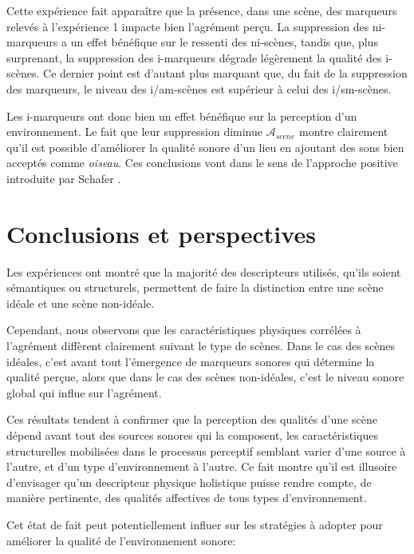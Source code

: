 \documentclass[twoside,twocolumn]{article}
\begin{document}
Cette expérience fait apparaître que la présence, dans une scène, des marqueurs relevés à l'expérience 1 impacte bien l'agrément perçu. La suppression des ni-marqueurs a un effet bénéfique sur le ressenti des ni-scènes, tandis que, plus surprenant, la suppression des i-marqueurs dégrade légèrement la qualité des i-scènes. Ce dernier point est d'autant plus marquant que, du fait de la suppression des marqueurs, le niveau des i/am-scènes est supérieur à celui des i/sm-scènes.

Les i-marqueurs ont donc bien un effet bénéfique sur la perception d'un environnement. Le fait que leur suppression diminue $\mathcal{A}_{scene}$ montre clairement qu'il est possible d'améliorer la qualité sonore d'un lieu en ajoutant des sons bien acceptés comme \emph{oiseau}. Ces conclusions vont dans le sens de l'approche positive introduite par Schafer \cite{schafer1977tuning}.




\section{Conclusions et perspectives}

Les expériences ont montré que la majorité des descripteurs utilisés, qu'ils soient sémantiques ou structurels, permettent de faire la distinction entre une scène idéale et une scène non-idéale.

Cependant, nous observons que les caractéristiques physiques corrélées à l'agrément diffèrent clairement suivant le type de scènes. Dans le cas des scènes idéales, c'est avant tout l'émergence de marqueurs sonores qui détermine la qualité perçue, alors que dans le cas des scènes non-idéales, c'est le niveau sonore global qui influe sur l'agrément.

Ces résultats tendent à confirmer que la perception des qualités d'une scène dépend avant tout des sources sonores qui la composent, les caractéristiques structurelles mobilisées dans le processus perceptif semblant varier d'une source à l'autre, et d'un type d'environnement à l'autre. Ce fait montre qu'il est illusoire d'envisager qu'un descripteur physique holistique puisse rendre compte, de manière pertinente, des qualités affectives de tous types d'environnement.

Cet état de fait peut potentiellement influer sur les stratégies à adopter pour améliorer la qualité de l’environnement sonore:
\end{document}

